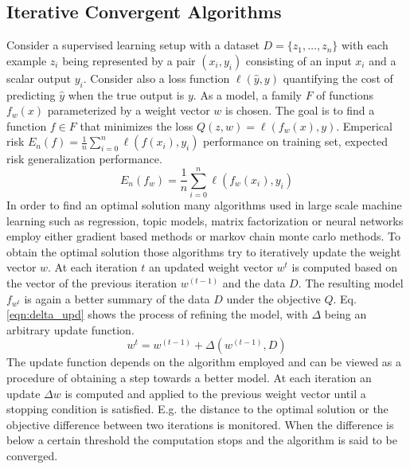\subsection{Iterative Convergent Algorithms}
\label{ss:ica}
Consider a supervised learning setup with a dataset $D = \{z_1,\ldots,z_n\}$ with each example $z_i$ being represented by a pair $(x_i,y_i)$ consisting of an input $x_i$ and a scalar output $y_i$.
Consider also a loss function $\ell(\hat{y},y)$ quantifying the cost of predicting $\hat{y}$ when the true output is $y$. As a model, a family $F$ of functions $f_w(x)$ parameterized by a weight vector $w$ is chosen.
The goal is to find a function $f \in F$ that minimizes the loss $Q(z, w) = \ell(f_w(x),y)$. Emperical risk $E_n(f) = \frac{1}{n}\sum_{i=0}^{n}\ell(f(x_i),y_i)$ performance on training set, expected risk generalization performance.
\begin{equation}
E_n(f_w) = \frac{1}{n}\sum_{i=0}^{n} \ell(f_w(x_i),y_i)
\label{eqn:emp_risk}
\end{equation}
In order to find an optimal solution many algorithms used in large scale machine learning such as regression, topic models, matrix factorization or neural networks employ either gradient based methods or markov chain monte carlo methods.
To obtain the optimal solution those algorithms try to iteratively update the weight vector $w$. At each iteration $t$ an updated weight vector $w^{t}$ is computed based on the vector of the previous iteration $w^{(t-1)}$ and the data $D$. The resulting model $f_{w^{t}}$ is again a better summary of the data $D$ under the objective $Q$. Eq. \ref{eqn:delta_upd} shows the process of refining the model, with $\Delta$ being an arbitrary update function.
\begin{equation}
w^{t} = w^{(t-1)} + \Delta(w^{(t-1)},D)
\label{eqn:delta_upd}
\end{equation}
The update function depends on the algorithm employed and can be viewed as a procedure of obtaining a step towards a better model. At each iteration an update $\Delta w$ is computed and applied to the previous weight vector until a stopping condition is satisfied. E.g. the distance to the optimal solution or the objective difference between two iterations is monitored. When the difference is below a certain threshold the computation stops and the algorithm is said to be converged.


